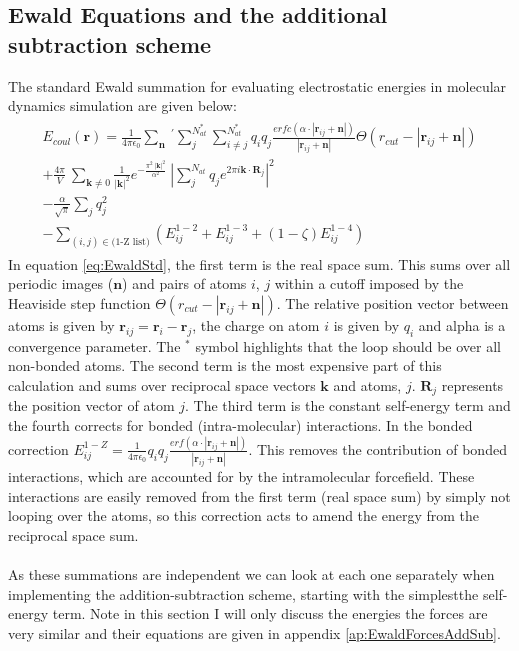 \subsection{Ewald Equations and the additional subtraction scheme}
The standard Ewald summation for evaluating electrostatic energies in molecular dynamics simulation are given below:
\begin{align}
  \begin{split}
E_{coul}\left(\mathbf{r}\right)
=
	  \frac{1}{4 \pi \epsilon_0} \sum_{\mathbf{n}} \ ^{'} \sum_{j}^{N_{at}^{*}} \sum_{i \neq j}^{N_{at}^{*}} q_i q_j \frac{erfc\left( \alpha \cdot |\mathbf{r}_{ij} + \mathbf{n}|\right)}{|\mathbf{r}_{ij} + \mathbf{n}|} \Theta\left( r_{cut} - |\mathbf{r}_{ij} + \mathbf{n}| \right)
\\
+
\frac{4 \pi}{ V} \ \sum_{\mathbf{k} \neq 0} \frac{1}{|\mathbf{k}|^2} e^{-\frac{\pi^2 \ |\mathbf{k}|^2}{\alpha^2}} \ \left|\sum_{j}^{N_{at}} q_{j} e^{2\pi i \mathbf{k} \cdot \mathbf{R}_{j}}\right|^2 \\
- \frac{\alpha}{\sqrt{\pi}} \sum_{j} q_{j}^2
\\
	  - \sum_{(i,j) \in (\text{1-Z list)}}\left(E^{1-2}_{ij} + E^{1-3}_{ij} + (1 - \zeta)E_{ij}^{1-4} \right)
	\end{split}
\label{eq:EwaldStd}
\end{align}
In equation \eqref{eq:EwaldStd}, the first term is the real space sum. This sums over all periodic images ($\mathbf{n}$) and pairs of atoms $i$, $j$ within a cutoff imposed by the Heaviside step function $\Theta(r_{cut} - |\mathbf{r}_{ij}+\mathbf{n}|)$. The relative position vector between atoms is given by $\mathbf{r}_{ij} = \mathbf{r}_{i} - \mathbf{r}_{j}$, the charge on atom $i$ is given by $q_{i}$ and alpha is a convergence parameter. The $^{*}$ symbol highlights that the loop should be over all non-bonded atoms. The second term is the most expensive part of this calculation and sums over reciprocal space vectors $\mathbf{k}$ and atoms, $j$. $\mathbf{R}_{j}$ represents the position vector of atom $j$. The third term is the constant self-energy term and the fourth corrects for bonded (intra-molecular) interactions. In the bonded correction $E_{ij}^{1-Z} = \frac{1}{4 \pi \epsilon_{0}} q_{i}q_{j} \frac{erf\left( \alpha \cdot |\mathbf{r}_{ij} + \mathbf{n}|\right)}{|\mathbf{r}_{ij} + \mathbf{n}|}$. This removes the contribution of bonded interactions, which are accounted for by the intramolecular forcefield. These interactions are easily removed from the first term (real space sum) by simply not looping over the atoms, so this correction acts to amend the energy from the reciprocal space sum.
\\\\
As these  summations are independent we can look at each one separately when implementing the addition-subtraction scheme, starting with the simplest\replace{ -}{, }the self-energy term. Note in this section I will only discuss the energies\replace{,}{;} the forces are very similar and their equations are given in appendix \ref{ap:EwaldForcesAddSub}.
